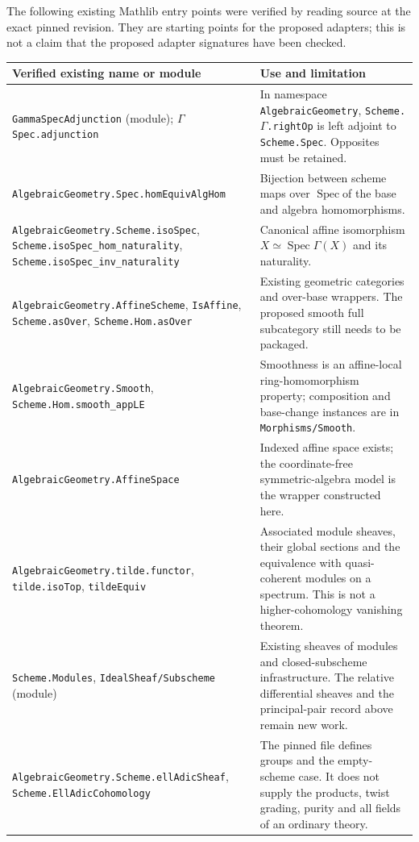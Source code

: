\documentclass[11pt]{article}
\newcommand{\Spec}{\operatorname{Spec}}
\newcommand{\planned}[1]{\texttt{\detokenize{#1}}}
\theoremstyle{definition}
\theoremstyle{remark}
\newcommand{\G}{\ensuremath{\Gamma}}
\renewcommand{\Spec}{\ensuremath{\operatorname{Spec}}}
\renewcommand{\planned}[1]{\nolinkurl{#1}}
\begin{document}
The following existing Mathlib entry points were verified by reading source at the exact pinned revision. They are starting points for the proposed adapters; this is not a claim that the proposed adapter signatures have been checked.
\small
\begin{longtable}{p{}p{}}
\toprule Verified existing name or module & Use and limitation\\\midrule\endhead
\planned{GammaSpecAdjunction} (module); \(\Gamma\)\planned{Spec.adjunction} & In namespace \planned{AlgebraicGeometry}, \planned{Scheme.}\(\Gamma\)\planned{.rightOp} is left adjoint to \planned{Scheme.Spec}. Opposites must be retained.\\
\planned{AlgebraicGeometry.Spec.homEquivAlgHom} & Bijection between scheme maps over \Spec of the base and algebra homomorphisms.\\
\planned{AlgebraicGeometry.Scheme.isoSpec}, \planned{Scheme.isoSpec_hom_naturality}, \planned{Scheme.isoSpec_inv_naturality} & Canonical affine isomorphism $X\simeq\Spec\G(X)$ and its naturality.\\
\planned{AlgebraicGeometry.AffineScheme}, \planned{IsAffine}, \planned{Scheme.asOver}, \planned{Scheme.Hom.asOver} & Existing geometric categories and over-base wrappers. The proposed smooth full subcategory still needs to be packaged.\\
\planned{AlgebraicGeometry.Smooth}, \planned{Scheme.Hom.smooth_appLE} & Smoothness is an affine-local ring-homomorphism property; composition and base-change instances are in \planned{Morphisms/Smooth}.\\
\planned{AlgebraicGeometry.AffineSpace} & Indexed affine space exists; the coordinate-free symmetric-algebra model is the wrapper constructed here.\\
\planned{AlgebraicGeometry.tilde.functor}, \planned{tilde.isoTop}, \planned{tildeEquiv} & Associated module sheaves, their global sections and the equivalence with quasi-coherent modules on a spectrum. This is not a higher-cohomology vanishing theorem.\\
\planned{Scheme.Modules}, \planned{IdealSheaf/Subscheme} (module) & Existing sheaves of modules and closed-subscheme infrastructure. The relative differential sheaves and the principal-pair record above remain new work.\\
\planned{AlgebraicGeometry.Scheme.ellAdicSheaf}, \planned{Scheme.EllAdicCohomology} & The pinned file defines groups and the empty-scheme case. It does not supply the products, twist grading, purity and all fields of an ordinary theory.\\
\bottomrule
\end{longtable}
\normalsize
\end{document}
